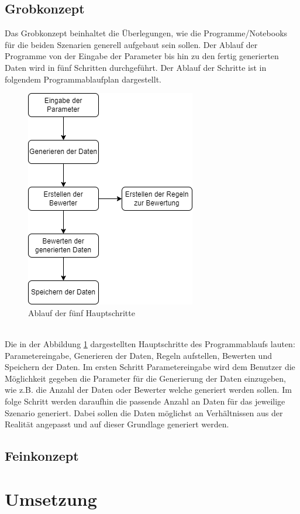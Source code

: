 \begin{onehalfspace}
\subsection{Grobkonzept}
\label{subsubsec:grobkonzept}
Das Grobkonzept beinhaltet die Überlegungen, wie die Programme/Notebooks für die beiden Szenarien generell aufgebaut sein sollen. Der Ablauf der Programme von der Eingabe der Parameter bis hin zu den fertig generierten Daten wird in fünf Schritten durchgeführt. Der Ablauf der Schritte ist in folgendem Programmablaufplan dargestellt.\\
\begin{figure}[!h]
    \centering
    \includegraphics{Diagramme/Grobkonzept_PAP.drawio.png}
    \caption{Ablauf der fünf Hauptschritte}
    \label{fig:GrobkonzeptPAP}
\end{figure}\\
Die in der Abbildung \ref{fig:GrobkonzeptPAP} dargestellten Hauptschritte des Programmablaufs lauten: Parametereingabe, Generieren der Daten, Regeln aufstellen, Bewerten und Speichern der Daten. Im ersten Schritt Parametereingabe wird dem Benutzer die Möglichkeit gegeben die Parameter für die Generierung der Daten einzugeben, wie z.B. die Anzahl der Daten oder Bewerter welche generiert werden sollen. Im folge Schritt werden daraufhin die passende Anzahl an Daten für das jeweilige Szenario generiert. Dabei sollen die Daten möglichst an Verhältnissen aus der Realität angepasst und auf dieser Grundlage generiert werden.
\subsection{Feinkonzept}
\label{subsubsec:feinkonzept}

\section{Umsetzung}
\label{umsetzung}

\newpage
\end{onehalfspace}